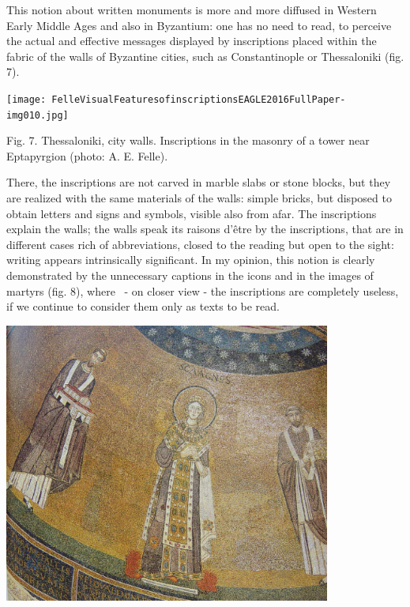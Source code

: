 \documentclass[amsthm,ebook]{saparticle}
\begin{document}
This notion about written monuments is more and more diffused in Western Early Middle Ages and also in Byzantium: one
has no need to read, to perceive the actual and effective messages displayed by inscriptions placed within the fabric
of the walls of Byzantine cities, such as Constantinople or Thessaloniki (fig. 7).

 \texttt{[image: FelleVisualFeaturesofinscriptionsEAGLE2016FullPaper-img010.jpg]} 

Fig. 7. Thessaloniki, city walls. Inscriptions in the masonry of a tower near Eptapyrgion (photo: A. E. Felle).


\bigskip


\bigskip

There, the inscriptions are not carved in marble slabs or stone blocks, but they are realized with the same materials of
the walls: simple bricks, but disposed to obtain letters and signs and symbols, visible also from afar. The
inscriptions explain the walls; the walls speak its raisons d'être by the inscriptions, that are in different cases
rich of abbreviations, closed to the reading but open to the sight: writing appears intrinsically significant. In my
opinion, this notion is clearly demonstrated by the unnecessary captions in the icons and in the images of martyrs
(fig. 8), where \ {}- on closer view - the inscriptions are completely useless, if we continue to consider them only as
texts to be read. 


\bigskip

 \includegraphics[width=10.749cm,height=9.208cm]{FelleVisualFeaturesofinscriptionsEAGLE2016FullPaper-img011.jpg} 


\bigskip
\end{document}

